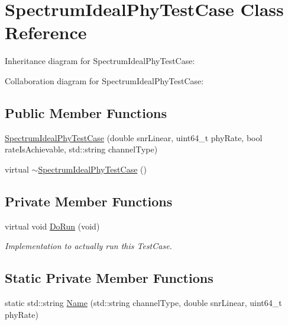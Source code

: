 \hypertarget{classSpectrumIdealPhyTestCase}{}\section{Spectrum\+Ideal\+Phy\+Test\+Case Class Reference}
\label{classSpectrumIdealPhyTestCase}


Inheritance diagram for Spectrum\+Ideal\+Phy\+Test\+Case\+:


Collaboration diagram for Spectrum\+Ideal\+Phy\+Test\+Case\+:
\subsection*{Public Member Functions}
\begin{DoxyCompactItemize}
\item 
\hyperlink{classSpectrumIdealPhyTestCase_acc569b032e65ab58fb216317033b15d1}{Spectrum\+Ideal\+Phy\+Test\+Case} (double snr\+Linear, uint64\+\_\+t phy\+Rate, bool rate\+Is\+Achievable, std\+::string channel\+Type)
\item 
virtual \hyperlink{classSpectrumIdealPhyTestCase_a1b7193f4a116e74406eb697bef3024eb}{$\sim$\+Spectrum\+Ideal\+Phy\+Test\+Case} ()
\end{DoxyCompactItemize}
\subsection*{Private Member Functions}
\begin{DoxyCompactItemize}
\item 
virtual void \hyperlink{classSpectrumIdealPhyTestCase_a25d1032a0b2d93dc10302aeae4b8338b}{Do\+Run} (void)
\begin{DoxyCompactList}\small\item\em Implementation to actually run this Test\+Case. \end{DoxyCompactList}\end{DoxyCompactItemize}
\subsection*{Static Private Member Functions}
\begin{DoxyCompactItemize}
\item 
static std\+::string \hyperlink{classSpectrumIdealPhyTestCase_a329bc07d698ded4d19c57c7c92838f81}{Name} (std\+::string channel\+Type, double snr\+Linear, uint64\+\_\+t phy\+Rate)
\end{DoxyCompactItemize}
